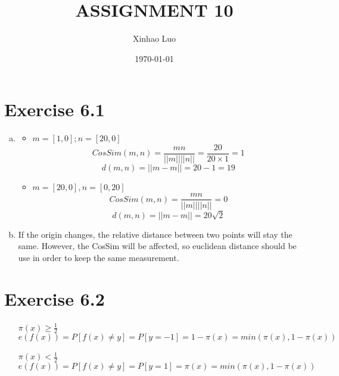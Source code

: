\documentclass{article}
\title{\bf \Large ASSIGNMENT 10}
\author{Xinhao Luo}
\date{\today}
\def\math#1{$#1$}
\begin{document}
\maketitle
\medskip

\section{Exercise 6.1}
\begin{enumerate}[a)]
    \item 
        \begin{itemize}
            \item \math{m = [1, 0]; n = [20, 0]}
            \begin{equation}
                CosSim(m, n) = \frac{mn}{||m||||n||} = \frac{20}{20 \times 1} = 1
            \end{equation}
            \begin{equation}
                d(m, n) = ||m - m|| = 20 - 1 = 19
            \end{equation}
            \item \math{m =[20, 0], n = [0, 20]}
             \begin{equation}
                CosSim(m, n) = \frac{mn}{||m||||n||} = 0
            \end{equation}
            \begin{equation}
                d(m, n) = ||m - m|| = 20\sqrt{2}
            \end{equation}
        \end{itemize}
    \item If the origin changes, the relative distance between two points will stay the same. However, the CosSim will be affected, so euclidean distance should be use in order to keep the same measurement.
\end{enumerate}

\section{Exercise 6.2}

\begin{itemize}
    \item [\math{\pi(x) \geq \frac{1}{2}}] \begin{equation}
        e(f(x)) = P[f(x) \neq y] = P[y = -1] = 1 - \pi(x) = min(\pi(x), 1 - \pi(x))
    \end{equation}
    \item [\math{\pi(x) < \frac{1}{2}}] \begin{equation}
        e(f(x)) = P[f(x) \neq y] = P[y = 1] = \pi(x) = min(\pi(x), 1 - \pi(x))
    \end{equation}
\end{itemize}
\end{document}
